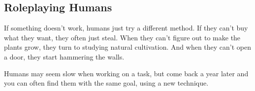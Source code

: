 \subsection{Roleplaying Humans}

If something doesn't work, humans just try a different method.
If they can't buy what they want, they often just steal.
When they can't figure out  to make the plants grow, they turn to studying natural cultivation.
And when they can't open a door, they start hammering the walls.

Humans may seem slow when working on a task, but come back a year later and you can often find them with the same goal, using a new technique.

